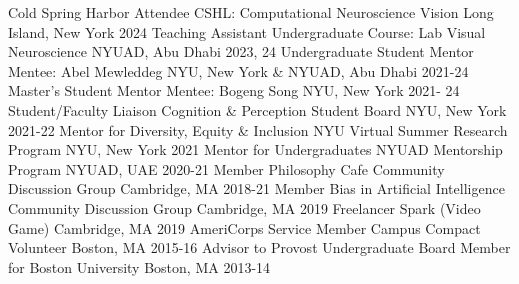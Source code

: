\begin{cvhonors}
  \cvhonor
    {Cold Spring Harbor Attendee}
    {CSHL: Computational Neuroscience Vision}
    {Long Island, New York}
    {2024}
  \cvhonor
    {Teaching Assistant}
    {Undergraduate Course: Lab Visual Neuroscience}
    {NYUAD, Abu Dhabi}
    {2023, 24}
  \cvhonor
    {Undergraduate Student Mentor}
    {Mentee: Abel Mewleddeg}
    {NYU, New York \& NYUAD, Abu Dhabi}
    {2021-24}
  \cvhonor
    {Master's Student Mentor}
    {Mentee: Bogeng Song}
    {NYU, New York}
    {2021- 24}
  \cvhonor
    {Student/Faculty Liaison}
    {Cognition \& Perception Student Board}
    {NYU, New York}
    {2021-22}
  \cvhonor
    {Mentor for Diversity, Equity \& Inclusion}
    {NYU Virtual Summer Research Program}
    {NYU, New York}
    {2021}
  \cvhonor
    {Mentor for Undergraduates}
    {NYUAD Mentorship Program}
    {NYUAD, UAE}
    {2020-21}
   \cvhonor
    {Member}
    {Philosophy Cafe Community Discussion Group}
    {Cambridge, MA}
    {2018-21}
  \cvhonor
    {Member}
    {Bias in Artificial Intelligence Community Discussion Group}
    {Cambridge, MA}
    {2019}
  \cvhonor
    {Freelancer}
    {Spark (Video Game)}
    {Cambridge, MA}
    {2019}
  \cvhonor
    {AmeriCorps Service Member}
    {Campus Compact Volunteer}
    {Boston, MA}
    {2015-16}
  \cvhonor
    {Advisor to Provost}
    {Undergraduate Board Member for Boston University}
    {Boston, MA}
    {2013-14}
\end{cvhonors}
